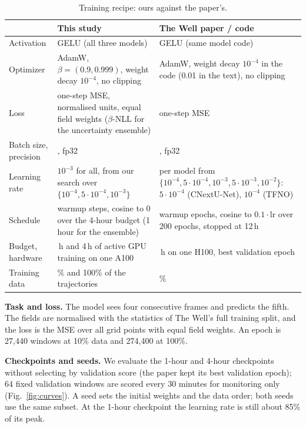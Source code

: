 \documentclass[11pt]{article}
\begin{document}
\begin{table}[tp]
\centering\footnotesize
\begin{tabularx}{\linewidth}{@{}>{\raggedright\arraybackslash}p{2.0cm}>{\raggedright\arraybackslash}X>{\raggedright\arraybackslash}X@{}}
\toprule
& This study & The Well paper / code \\
\midrule
Activation & GELU (all three models) & GELU (same model code) \\
Optimizer & AdamW, $\beta = (0.9, 0.999)$, weight decay $10^{-4}$, no clipping & AdamW, weight decay $10^{-4}$ in the code (0.01 in the text), no clipping \\
Loss & one-step MSE, normalised units, equal field weights ($\beta$-NLL for the uncertainty ensemble) & one-step MSE \\
Batch size, precision & 64, fp32 & 64, fp32 \\
Learning rate & $10^{-3}$ for all, from our search over $\{10^{-4}, 5\cdot10^{-4}, 10^{-3}\}$ & per model from $\{10^{-4}, 5\cdot10^{-4}, 10^{-3}, 5\cdot10^{-3}, 10^{-2}\}$: $5\cdot10^{-4}$ (CNextU-Net), $10^{-4}$ (TFNO) \\
Schedule & 500 warmup steps, cosine to 0 over the 4-hour budget (1 hour for the ensemble) & 5 warmup epochs, cosine to $0.1\cdot$lr over 200 epochs, stopped at 12\,h \\
Budget, hardware & 1\,h and 4\,h of active GPU training on one A100 & 12\,h on one H100, best validation epoch \\
Training data & 10\% and 100\% of the trajectories & 100\% \\
\bottomrule
\end{tabularx}
\caption{Training recipe: ours against the paper's.}
\label{tab:recipe}
\end{table}

\textbf{Task and loss.} The model sees four consecutive frames and predicts the fifth. The fields are normalised
with the statistics of The Well's full training split, and the loss is the MSE over all grid points with equal
field weights. An epoch is 27,440 windows at 10\% data and 274,400 at 100\%.

\textbf{Checkpoints and seeds.} We evaluate the 1-hour and 4-hour checkpoints without selecting by validation score
(the paper kept its best validation epoch); 64 fixed validation windows are scored every 30 minutes for monitoring
only (Fig.~\ref{fig:curves}). A seed sets the initial weights and the data order; both seeds use the same subset. At
the 1-hour checkpoint the learning rate is still about 85\% of its peak.
\end{document}
